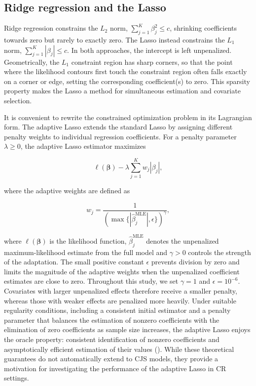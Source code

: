 \documentclass[
  11pt,
  a4paper,
]{article}
\begin{document}
\subsection{Ridge regression and the Lasso}\label{ridge-regression-and-the-lasso}

Ridge regression constrains the \(L_2\) norm, \(\sum_{j=1}^K \beta_j^2 \le c\), shrinking coefficients towards zero but rarely to exactly zero. The Lasso instead constrains the \(L_1\) norm, \(\sum_{j=1}^K |\beta_j| \le c\). In both approaches, the intercept is left unpenalized. Geometrically, the \(L_1\) constraint region has sharp corners, so that the point where the likelihood contours first touch the constraint region often falls exactly on a corner or edge, setting the corresponding coefficient(s) to zero. This sparsity property makes the Lasso a method for simultaneous estimation and covariate selection.

It is convenient to rewrite the constrained optimization problem in its Lagrangian form. The adaptive Lasso extends the standard Lasso by assigning different penalty weights to individual regression coefficients. For a penalty parameter \(\lambda \ge 0\), the adaptive Lasso estimator maximizes

\[
\ell(\boldsymbol{\beta}) -
\lambda \sum_{j=1}^{K} w_j |\beta_j|,
\]

where the adaptive weights are defined as

\[
w_j=\frac{1}{
\left(\max\{|\hat{\beta}^{\mathrm{MLE}}_j|,\epsilon\}\right)^\gamma
},
\]

where \(\ell(\boldsymbol{\beta})\) is the likelihood function, \(\hat{\beta}^{\mathrm{MLE}}_j\) denotes the unpenalized maximum-likelihood estimate from the full model and \(\gamma>0\) controls the strength of the adaptation. The small positive constant \(\epsilon\) prevents division by zero and limits the magnitude of the adaptive weights when the unpenalized coefficient estimates are close to zero. Throughout this study, we set \(\gamma=1\) and \(\epsilon=10^{-6}\). Covariates with larger unpenalized effects therefore receive a smaller penalty, whereas those with weaker effects are penalized more heavily. Under suitable regularity conditions, including a consistent initial estimator and a penalty parameter that balances the estimation of nonzero coefficients with the elimination of zero coefficients as sample size increases, the adaptive Lasso enjoys the oracle property: consistent identification of nonzero coefficients and asymptotically efficient estimation of their values (). While these theoretical guarantees do not automatically extend to CJS models, they provide a motivation for investigating the performance of the adaptive Lasso in CR settings.
\end{document}

